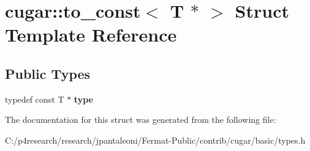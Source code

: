 \hypertarget{structcugar_1_1to__const_3_01_t_01_5_01_4}{}\section{cugar\+:\+:to\+\_\+const$<$ T $\ast$ $>$ Struct Template Reference}
\label{structcugar_1_1to__const_3_01_t_01_5_01_4}
\subsection*{Public Types}
\begin{DoxyCompactItemize}
\item 
\mbox{\label{structcugar_1_1to__const_3_01_t_01_5_01_4_a61d1c62f3345276acc4ca9aeedbad359}} 
typedef const T $\ast$ {\bfseries type}
\end{DoxyCompactItemize}


The documentation for this struct was generated from the following file\+:\begin{DoxyCompactItemize}
\item 
C\+:/p4research/research/jpantaleoni/\+Fermat-\/\+Public/contrib/cugar/basic/types.\+h\end{DoxyCompactItemize}
